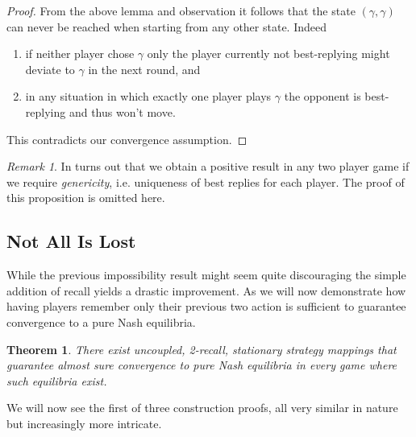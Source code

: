 \documentclass[a4paper]{article}
\theoremstyle{plain}
\newtheorem{theorem}{Theorem}
\theoremstyle{remark}
\newtheorem{remark}{Remark}
\begin{document}
\begin{proof}
From the above lemma and observation it follows that the state $(\gamma, \gamma)$ can
never be reached when starting from any other state. Indeed
\begin{enumerate}
	\item if neither player chose $\gamma$ only the player currently not best-replying might deviate to $\gamma$ in the next round, and
	\item in any situation in which exactly one player plays $\gamma$ the opponent is best-replying and thus won't move.
\end{enumerate}
This contradicts our convergence assumption.
\end{proof}


\begin{remark}
	In turns out that we obtain a positive result in any two player game if we require \emph{genericity}, i.e.
	uniqueness of best replies for each player. The proof of this proposition is omitted here.
\end{remark}

\subsection{Not All Is Lost} %

While the previous impossibility result might seem quite discouraging the simple addition of recall
yields a drastic improvement. As we will now demonstrate how having players remember only their previous
two action is sufficient to guarantee convergence to a pure Nash equilibria.

\begin{theorem}
There exist uncoupled, 2-recall, stationary strategy mappings that guarantee almost sure convergence to
pure Nash equilibria  in every game where such equilibria exist.
\end{theorem}

We will now see the first of three construction proofs, all very similar in nature but increasingly more intricate.
\end{document}
